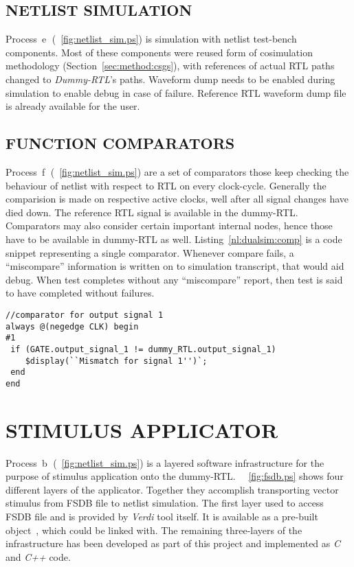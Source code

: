 \subsection{NETLIST SIMULATION}
Process~\textcircled{e} (\figurename~{\ref{fig:netlist_sim.ps}}) is simulation with netlist test-bench components. Most of these components were reused form of cosimulation methodology (Section~\ref{sec:method:csgs}), with references of actual RTL paths changed to {\it Dummy-RTL}'s paths. Waveform dump needs to be enabled during simulation to enable debug in case of failure. Reference RTL waveform dump file is already available for the user.


\subsection{FUNCTION COMPARATORS}
Process~\textcircled{f} (\figurename~{\ref{fig:netlist_sim.ps}}) are a set of comparators those keep checking the behaviour of netlist with respect to RTL on every clock-cycle. Generally the comparision is made on respective active clocks, well after all signal changes have died down. The reference RTL signal is available in the dummy-RTL. Comparators may also consider certain important internal nodes, hence those have to be available in dummy-RTL as well. Listing~\ref{nl:dualsim:comp} is a code snippet representing a single comparator. Whenever compare fails, a ``miscompare'' information is written on to simulation transcript, that would aid debug. When test completes without any ``miscompare'' report, then test is said to have completed without failures.

\lstset{language=Verilog,
basicstyle=\footnotesize,
frame=shadowbox,
breaklines=true}          
\begin{lstlisting}[frame=single, caption=Cycle Based Comparison, label=nl:dualsim:comp ] 
//comparator for output signal 1 
always @(negedge CLK) begin
#1
 if (GATE.output_signal_1 != dummy_RTL.output_signal_1)
    $display(``Mismatch for signal 1'')`;
 end
end

\end{lstlisting}


\section{STIMULUS APPLICATOR}
\label{sec:dualsim:sa}
Process~\textcircled{b} (\figurename~{\ref{fig:netlist_sim.ps}}) is a layered software infrastructure for the purpose of stimulus application onto the dummy-RTL. ~\figurename{~\ref{fig:fsdb.ps}} shows four different layers of the applicator. Together they accomplish transporting vector stimulus from FSDB file to netlist simulation. The first layer used to access FSDB file and is provided by {\it Verdi} tool itself. It is available as a pre-built object~\citep{Verdi:FsdbReader}, which could be linked with. The remaining three-layers of the infrastructure has been developed as part of this project and implemented as {\it C} and {\it C++} code.

